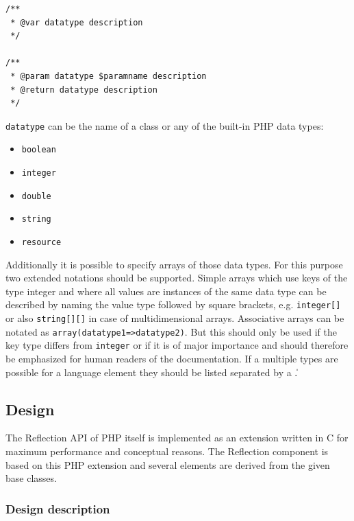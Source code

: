 \documentclass[10pt,final,a4paper,oneside]{article}
\begin{document}
\begin{verbatim}
/**
 * @var datatype description
 */

/**
 * @param datatype $paramname description
 * @return datatype description
 */
\end{verbatim}

\noindent
\verb|datatype| can be the name of a class
or any of the built-in PHP data types:

\begin{itemize}
	\item \verb|boolean|
	\item \verb|integer|
	\item \verb|double|
	\item \verb|string|
	\item \verb|resource|
\end{itemize}

Additionally it is possible to specify arrays of those
data types.
For this purpose two extended notations should be supported.
Simple arrays which use keys of the type integer and
where all values are instances of the same data type
can be described by naming the value type followed by square brackets,
e.g. \verb|integer[]| or also \verb|string[][]|
in case of multidimensional arrays.
Associative arrays can be notated as
\verb|array(datatype1=>datatype2)|.
But this should only be used
if the key type differs from \verb|integer|
or if it is of major importance
and should therefore be emphasized
for human readers of the documentation. 
If a multiple types are possible for a language element
they should be listed separated by a \|.


\subsection{Design}\label{subsec:ReflectionDesign}
%
%

The Reflection API of PHP \cite{PHP5Reflection}
itself is implemented as an extension written in C
for maximum performance and conceptual reasons.
The Reflection component is based on this PHP extension
and several elements are derived from the given base classes.

\subsubsection{Design description}
\end{document}
